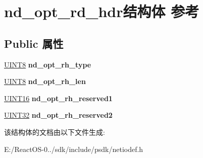 \hypertarget{structnd__opt__rd__hdr}{}\section{nd\+\_\+opt\+\_\+rd\+\_\+hdr结构体 参考}
\label{structnd__opt__rd__hdr}
\subsection*{Public 属性}
\begin{DoxyCompactItemize}
\item 
\mbox{\label{structnd__opt__rd__hdr_ae9fc17e945b4213cf3cbfdbf7e69fafb}} 
\hyperlink{_processor_bind_8h_ab27e9918b538ce9d8ca692479b375b6a}{U\+I\+N\+T8} {\bfseries nd\+\_\+opt\+\_\+rh\+\_\+type}
\item 
\mbox{\label{structnd__opt__rd__hdr_ae5fa9d6ba3b8bff7a98574f380c035cd}} 
\hyperlink{_processor_bind_8h_ab27e9918b538ce9d8ca692479b375b6a}{U\+I\+N\+T8} {\bfseries nd\+\_\+opt\+\_\+rh\+\_\+len}
\item 
\mbox{\label{structnd__opt__rd__hdr_a76e51403de635969ca0595da2050e092}} 
\hyperlink{_processor_bind_8h_a09f1a1fb2293e33483cc8d44aefb1eb1}{U\+I\+N\+T16} {\bfseries nd\+\_\+opt\+\_\+rh\+\_\+reserved1}
\item 
\mbox{\label{structnd__opt__rd__hdr_afecc87cee3af511487c0362669edbf2b}} 
\hyperlink{_processor_bind_8h_ae1e6edbbc26d6fbc71a90190d0266018}{U\+I\+N\+T32} {\bfseries nd\+\_\+opt\+\_\+rh\+\_\+reserved2}
\end{DoxyCompactItemize}


该结构体的文档由以下文件生成\+:\begin{DoxyCompactItemize}
\item 
E\+:/\+React\+O\+S-\/0../sdk/include/psdk/netiodef.\+h\end{DoxyCompactItemize}
